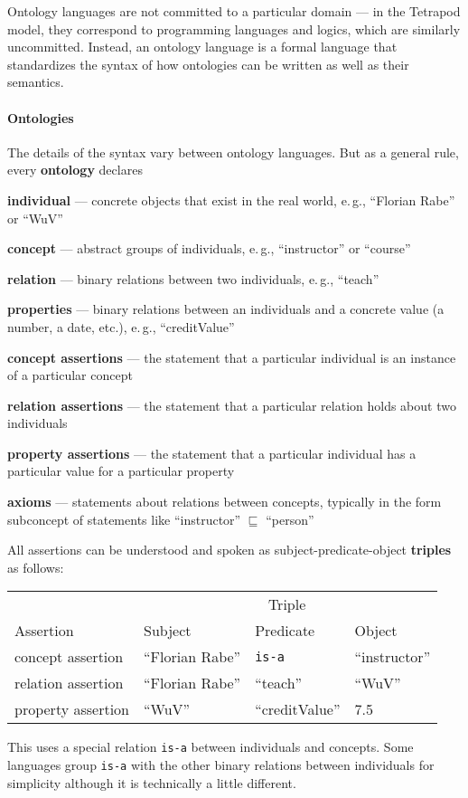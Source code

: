 Ontology languages are not committed to a particular domain --- in the Tetrapod model, they correspond to programming languages and logics, which are similarly uncommitted.
Instead, an ontology language is a formal language that standardizes the syntax of how ontologies can be written as well as their semantics.

\paragraph{Ontologies}
The details of the syntax vary between ontology languages.
But as a general rule, every \textbf{ontology} declares
\begin{compactitem}
\item \textbf{individual} --- concrete objects that exist in the real world, e.\,g., \enquote{Florian Rabe} or \enquote{WuV}
\item \textbf{concept} --- abstract groups of individuals, e.\,g., \enquote{instructor} or \enquote{course}
\item \textbf{relation} --- binary relations between two individuals, e.\,g., \enquote{teach}
\item \textbf{properties} --- binary relations between an individuals and a concrete value (a number, a date, etc.), e.\,g., \enquote{creditValue}
 \item \textbf{concept assertions} --- the statement that a particular individual is an instance of a particular concept
 \item \textbf{relation assertions} --- the statement that a particular relation holds about two individuals
 \item \textbf{property assertions} --- the statement that a particular individual has a particular value for a particular property
 \item \textbf{axioms} --- statements about relations between concepts, typically in the form subconcept of statements like \enquote{instructor} $\sqsubseteq$ \enquote{person}
\end{compactitem}

All assertions can be understood and spoken as subject-predicate-object \textbf{triples} as follows:
\begin{center}
\begin{tabular}{llll}
\toprule
	& \multicolumn{3}{c}{Triple} \\
\cmidrule(lr){2-4}
Assertion & Subject & Predicate & Object \\
\midrule
concept assertion  & \enquote{Florian Rabe} & \texttt{is-a} & \enquote{instructor} \\
relation assertion & \enquote{Florian Rabe} & \enquote{teach} & \enquote{WuV} \\
property assertion & \enquote{WuV} & \enquote{creditValue} & 7.5 \\
\bottomrule
\end{tabular}
\end{center}
This uses a special relation \texttt{is-a} between individuals and concepts.
Some languages group \texttt{is-a} with the other binary relations between individuals for simplicity although it is technically a little different.

